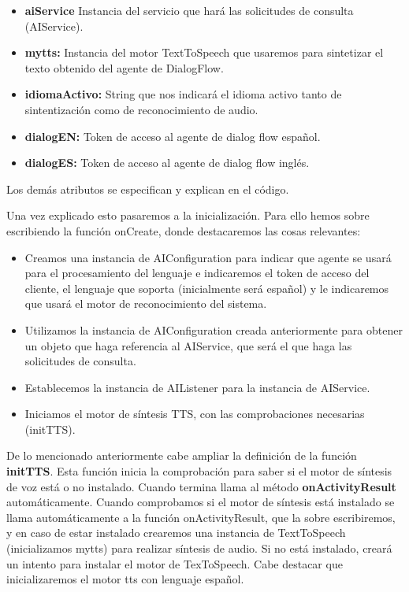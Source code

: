\begin{itemize}
	\item \textbf{aiService} Instancia del servicio que hará las solicitudes de consulta (AIService).
	\item \textbf{mytts:} Instancia del motor TextToSpeech que usaremos para sintetizar el texto obtenido del agente de DialogFlow.
	\item \textbf{idiomaActivo:} String que nos indicará el idioma activo tanto de sintentización como de reconocimiento de audio.
	\item \textbf{dialogEN:} Token de acceso al agente de dialog flow español.
	\item \textbf{dialogES:} Token de acceso al agente de dialog flow inglés.
\end{itemize}
Los demás atributos se especifican y explican en el código.
\newpage

Una vez explicado esto pasaremos a la inicialización. Para ello hemos sobre escribiendo la función onCreate, donde destacaremos las cosas relevantes: 
\begin{itemize}
	\item Creamos una instancia de AIConfiguration para indicar que agente se usará para el procesamiento del lenguaje e indicaremos el token de acceso del cliente, el lenguaje que soporta (inicialmente será español) y le indicaremos que usará el motor de reconocimiento del sistema.
	\item Utilizamos la instancia de AIConfiguration creada anteriormente para obtener un objeto que haga referencia al AIService, que será el que haga las solicitudes de consulta.
	\item Establecemos la instancia de AIListener para la instancia de AIService.
	\item Iniciamos el motor de síntesis TTS, con las comprobaciones necesarias (initTTS).
\end{itemize}

De lo mencionado anteriormente cabe ampliar la definición de la función \textbf{initTTS}. Esta función inicia la comprobación para saber si el motor de síntesis de voz está o no instalado. Cuando termina llama al método \textbf{onActivityResult} automáticamente. Cuando comprobamos si el motor de síntesis está instalado se llama automáticamente a la función onActivityResult, que la sobre escribiremos, y en caso de estar instalado crearemos una instancia de TextToSpeech (inicializamos mytts) para realizar síntesis de audio. Si no está instalado, creará un intento para instalar el motor de TexToSpeech. Cabe destacar que  inicializaremos el motor tts con lenguaje español. \\

